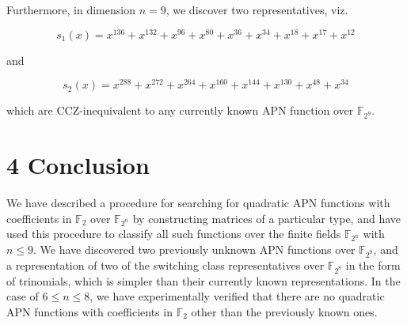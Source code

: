 \documentclass[10pt]{article}
\begin{document}
Furthermore, in dimension $n=9$, we discover two representatives, viz.

$$
s_{1}(x)=x^{136}+x^{132}+x^{96}+x^{80}+x^{36}+x^{34}+x^{18}+x^{17}+x^{12}
$$

and

$$
s_{2}(x)=x^{288}+x^{272}+x^{264}+x^{160}+x^{144}+x^{130}+x^{48}+x^{34}
$$

which are CCZ-inequivalent to any currently known APN function over $\mathbb{F}_{2^{9}}$.

\section*{4 Conclusion}
We have described a procedure for searching for quadratic APN functions with coefficients in $\mathbb{F}_{2}$ over $\mathbb{F}_{2^{n}}$ by constructing matrices of a particular type, and have used this procedure to classify all such functions over the finite fields $\mathbb{F}_{2^{n}}$ with $n \leq 9$. We have discovered two previously unknown APN functions over $\mathbb{F}_{2^{9}}$, and a representation of two of the switching class representatives over $\mathbb{F}_{2^{8}}$ in the form of trinomials, which is simpler than their currently known representations. In the case of $6 \leq n \leq 8$, we have experimentally verified that there are no quadratic APN functions with coefficients in $\mathbb{F}_{2}$ other than the previously known ones.
\end{document}
